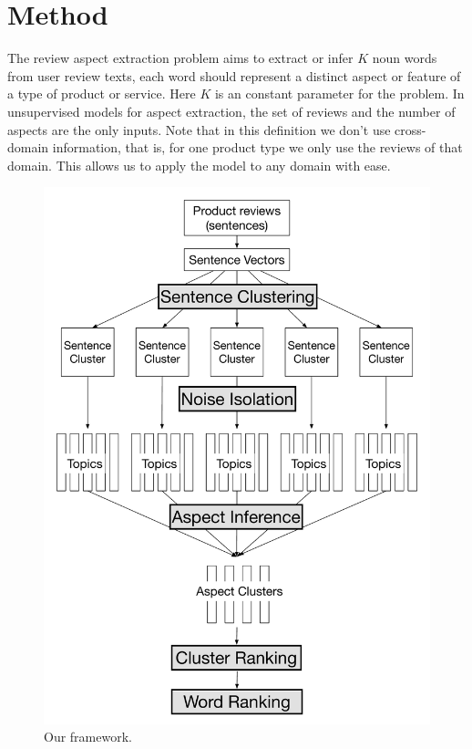 \section{Method}
\label{sec:method}

The review aspect extraction problem aims to extract or infer $K$ noun 
words from user review texts,
each word should represent a distinct aspect or feature of a type of product or service. 
Here $K$ is an constant parameter for the problem. 
In unsupervised models for aspect extraction, 
the set of reviews and the number of aspects are the only inputs.
Note that in this definition we don't use cross-domain information, 
that is, for one product type we only use the reviews of that domain.
This allows us to apply the model to any domain with ease.

\begin{figure}[th]
\centering
\includegraphics[width=0.9\columnwidth]{figures/framework}
\caption{Our framework.}
\label{fig:framework}
\end{figure}

